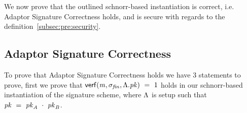 We now prove that the outlined schnorr-based instantiation is correct, i.e. Adaptor Signature Correctness holds, and is secure with regards to the definition~\ref{subsec:pre:security}.

\subsection{Adaptor Signature Correctness}\label{subsec:sig:aptsig-correctness}

To prove that Adaptor Signature Correctness holds we have 3 statements to prove, first we prove that $\mathsf{verf}(\mathit{m}, \sigma_{\mathit{fin}}, \Lambda.\mathit{pk}) ~=~ 1$ holds in our
schnorr-based instantiation of the signature scheme, where $\Lambda$ is setup such that $\mathit{pk} ~=~ \mathit{pk}_{\mathit{A}} ~\cdot~ \mathit{pk}_{\mathit{B}}$.

